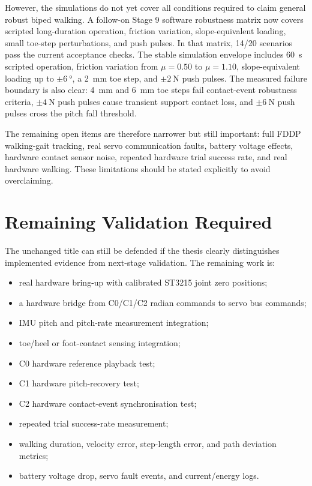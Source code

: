 However, the simulations do not yet cover all conditions required to claim
general robust biped walking. A follow-on Stage 9 software robustness matrix
now covers scripted long-duration operation, friction variation,
slope-equivalent loading, small toe-step perturbations, and push pulses. In
that matrix, 14/20 scenarios pass the current acceptance checks. The stable
simulation envelope includes \SI{60}{\second} scripted operation, friction
variation from $\mu=0.50$ to $\mu=1.10$, slope-equivalent loading up to
$\pm\SI{6}{\degree}$, a \SI{2}{\milli\metre} toe step, and $\pm\SI{2}{\newton}$
push pulses. The measured failure boundary is also clear: \SI{4}{\milli\metre}
and \SI{6}{\milli\metre} toe steps fail contact-event robustness criteria,
$\pm\SI{4}{\newton}$ push pulses cause transient support contact loss, and
$\pm\SI{6}{\newton}$ push pulses cross the pitch fall threshold.

The remaining open items are therefore narrower but still important: full FDDP
walking-gait tracking, real servo communication faults, battery voltage
effects, hardware contact sensor noise, repeated hardware trial success rate,
and real hardware walking. These limitations should be stated explicitly to
avoid overclaiming.

\section{Remaining Validation Required}
\label{sec:remaining_validation_required_20260708}

The unchanged title can still be defended if the thesis clearly distinguishes
implemented evidence from next-stage validation. The remaining work is:

\begin{itemize}
    \item real hardware bring-up with calibrated ST3215 joint zero positions;
    \item a hardware bridge from C0/C1/C2 radian commands to servo bus commands;
    \item IMU pitch and pitch-rate measurement integration;
    \item toe/heel or foot-contact sensing integration;
    \item C0 hardware reference playback test;
    \item C1 hardware pitch-recovery test;
    \item C2 hardware contact-event synchronisation test;
    \item repeated trial success-rate measurement;
    \item walking duration, velocity error, step-length error, and path
    deviation metrics;
    \item battery voltage drop, servo fault events, and current/energy logs.
\end{itemize}

